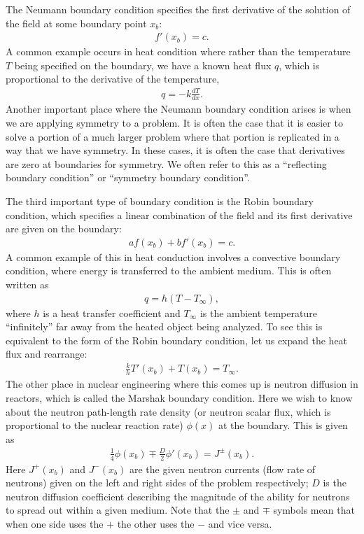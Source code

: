 The Neumann boundary condition specifies the first derivative of the solution of the field at some boundary point $x_b$:
\begin{align}
  f'(x_b) = c.
\end{align}
A common example occurs in heat condition where rather than the temperature $T$ being specified on the boundary, we have a known heat flux $q$, which is proportional to the derivative of the temperature,
\begin{align}
  q = -k \frac{dT}{dx}.
\end{align}
Another important place where the Neumann boundary condition arises is when we are applying symmetry to a problem. It is often the case that it is easier to solve a portion of a much larger problem where that portion is replicated in a way that we have symmetry. In these cases, it is often the case that derivatives are zero at boundaries for symmetry. We often refer to this as a ``reflecting boundary condition'' or ``symmetry boundary condition''.

The third important type of boundary condition is the Robin boundary condition, which specifies a linear combination of the field and its first derivative are given on the boundary:
\begin{align}
  a f(x_b) + b f'(x_b) = c.
\end{align}
A common example of this in heat conduction involves a convective boundary condition, where energy is transferred to the ambient medium. This is often written as
\begin{align}
  q = h ( T - T_\infty ),
\end{align}
where $h$ is a heat transfer coefficient and $T_\infty$ is the ambient temperature ``infinitely'' far away from the heated object being analyzed. To see this is equivalent to the form of the Robin boundary condition, let us expand the heat flux and rearrange:
\begin{align}
  \frac{k}{h} T'(x_b) + T(x_b) = T_\infty .
\end{align}
The other place in nuclear engineering where this comes up is neutron diffusion in reactors, which is called the Marshak boundary condition. Here we wish to know about the neutron path-length rate density (or neutron scalar flux, which is proportional to the nuclear reaction rate) $\phi(x)$ at the boundary. This is given as
\begin{align}
   \frac{1}{4} \phi(x_b) \mp \frac{D}{2} \phi'(x_b) = J^{\pm}(x_b). 
\end{align}
Here $J^+(x_b)$ and $J^-(x_b)$ are the given neutron currents (flow rate of neutrons) given on the left and right sides of the problem respectively; $D$ is the neutron diffusion coefficient describing the magnitude of the ability for neutrons to spread out within a given medium. Note that the $\pm$ and $\mp$ symbols mean that when one side uses the $+$ the other uses the $-$ and vice versa.

